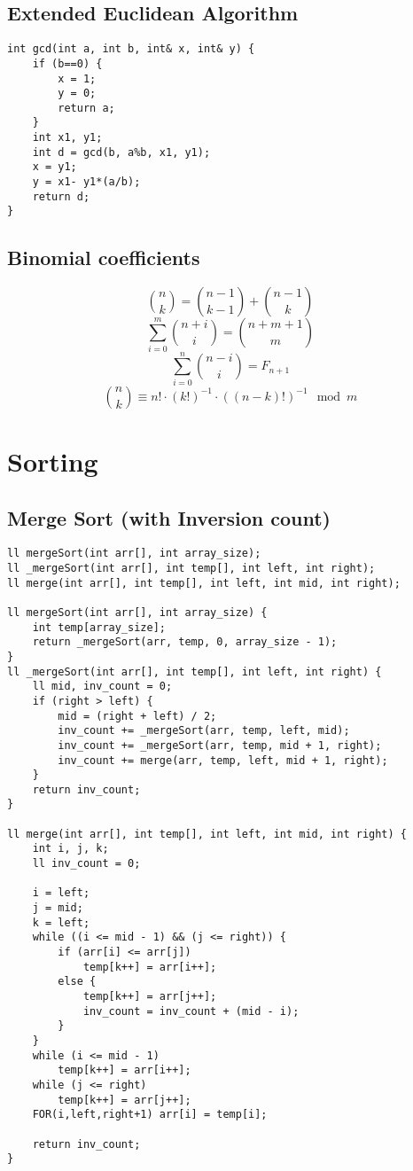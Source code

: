 \documentclass{article}
\begin{document}
    \subsection{Extended Euclidean Algorithm}
    
    \begin{lstlisting}
int gcd(int a, int b, int& x, int& y) {
    if (b==0) {
        x = 1;
        y = 0;
        return a;
    }
    int x1, y1;
    int d = gcd(b, a%b, x1, y1);
    x = y1;
    y = x1- y1*(a/b);
    return d;
}
    \end{lstlisting}

	\subsection{Binomial coefficients}
	$$\binom{n}{k} = \binom{n-1}{k-1}+\binom{n-1}{k}$$
	$$\sum_{i=0}^{m}\binom{n+i}{i} = \binom{n+m+1}{m}$$
	$$\sum_{i=0}^{n}\binom{n-i}{i} = F_{n+1}$$
	$$\binom{n}{k}\equiv n!\cdot(k!)^{-1}\cdot((n-k)!)^{-1}\mod{m}$$

    \section{Sorting}
        \subsection{Merge Sort (with Inversion count)}


        \begin{lstlisting}
ll mergeSort(int arr[], int array_size);
ll _mergeSort(int arr[], int temp[], int left, int right);
ll merge(int arr[], int temp[], int left, int mid, int right);

ll mergeSort(int arr[], int array_size) {
    int temp[array_size];
    return _mergeSort(arr, temp, 0, array_size - 1);
}
ll _mergeSort(int arr[], int temp[], int left, int right) {
    ll mid, inv_count = 0;
    if (right > left) {
        mid = (right + left) / 2;
        inv_count += _mergeSort(arr, temp, left, mid);
        inv_count += _mergeSort(arr, temp, mid + 1, right);
        inv_count += merge(arr, temp, left, mid + 1, right);
    }
    return inv_count;
}

ll merge(int arr[], int temp[], int left, int mid, int right) {
    int i, j, k;
    ll inv_count = 0;

    i = left;
    j = mid;
    k = left;
    while ((i <= mid - 1) && (j <= right)) {
        if (arr[i] <= arr[j])
            temp[k++] = arr[i++];
        else {
            temp[k++] = arr[j++];
            inv_count = inv_count + (mid - i);
        }
    }
    while (i <= mid - 1)
        temp[k++] = arr[i++];
    while (j <= right)
        temp[k++] = arr[j++];
    FOR(i,left,right+1) arr[i] = temp[i];

    return inv_count;
}       \end{lstlisting}
\end{document}
